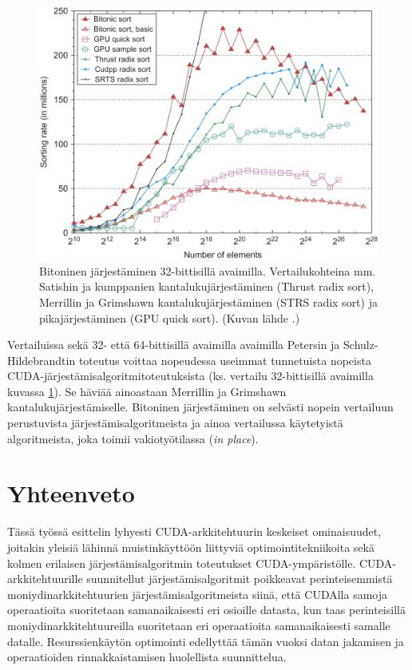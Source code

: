 \documentclass[a4paper,11pt]{article}
\newcommand{\engl}[1]{\foreignlanguage{english}{\em #1}}
\begin{document}
\begin{figure}
\centering
\includegraphics[scale = 1.0]{bitonic_32bit}
\caption{Bitoninen järjestäminen 32-bittisillä avaimilla. Vertailukohteina mm. Satishin ja kumppanien \cite{satish2009} kantalukujärjestäminen (Thrust radix sort), Merrillin ja Grimshawn kantalukujärjestäminen \cite{merrill2011} (STRS radix sort) ja pikajärjestäminen \cite{cederman2009} (GPU quick sort). (Kuvan lähde \cite{peters2012gems}.)}
\label{fig:bitonic_32bit}
\end{figure}

Vertailuissa sekä 32- että 64-bittisillä avaimilla avaimilla Petersin ja Schulz-Hildebrandtin toteutus voittaa nopeudessa useimmat tunnetuista nopeista CUDA-järjestämisalgoritmitoteutuksista (ks. vertailu 32-bittisillä avaimilla kuvassa \ref{fig:bitonic_32bit}). Se häviää ainoastaan Merrillin ja Grimshawn \cite{merrill2011} kantalukujärjestämiselle. Bitoninen järjestäminen on selvästi nopein vertailuun perustuvista järjestämisalgoritmeista ja ainoa vertailussa käytetyistä algoritmeista, joka toimii vakiotyötilassa (\engl{in place}).

\section{Yhteenveto}

Tässä työssä esittelin lyhyesti CUDA-arkkitehtuurin keskeiset ominaisuudet, joitakin yleisiä lähinnä muistinkäyttöön liittyviä optimointitekniikoita sekä kolmen erilaisen järjestämisalgoritmin toteutukset CUDA-ympäristölle. CUDA-ark\-ki\-teh\-tuu\-ril\-le suunnitellut järjestämisalgoritmit poikkeavat perinteisemmistä moniydinarkkitehtuurien järjestämisalgoritmeista siinä, että CUDAlla samoja operaatioita suoritetaan samanaikaisesti eri osioille datasta, kun taas perinteisillä moniydinarkkitehtuureilla suoritetaan eri operaatioita samanaikaisesti samalle datalle. Resurssienkäytön optimointi edellyttää tämän vuoksi datan jakamisen ja operaatioiden rinnakkaistamisen huolellista suunnittelua.
\end{document}

